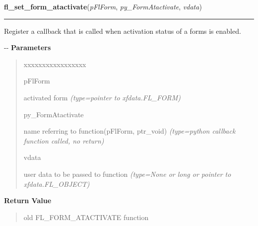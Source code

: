     \label{xformslib:flbasic:fl_set_form_atactivate}

    \vspace{0.5ex}

\hspace{.8\funcindent}\begin{boxedminipage}{\funcwidth}

    \raggedright \textbf{fl\_set\_form\_atactivate}(\textit{pFlForm}, \textit{py\_FormAtactivate}, \textit{vdata})

    \vspace{-1.5ex}

    \rule{\textwidth}{0.5\fboxrule}
\setlength{\parskip}{2ex}

Register a callback that is called when activation status of a forms
is enabled.

-{}-
\setlength{\parskip}{1ex}
      \textbf{Parameters}
      \vspace{-1ex}

      \begin{quote}
        \begin{Ventry}{xxxxxxxxxxxxxxxxx}

          \item[pFlForm]


activated form
            {\it (type=pointer to xfdata.FL\_FORM)}

          \item[py\_FormAtactivate]


name referring to function(pFlForm, ptr\_void)
            {\it (type=python callback function called, no return)}

          \item[vdata]


user data to be passed to function
            {\it (type=None or long or pointer to xfdata.FL\_OBJECT)}

        \end{Ventry}

      \end{quote}

      \textbf{Return Value}
    \vspace{-1ex}

      \begin{quote}

old FL\_FORM\_ATACTIVATE function
      \end{quote}


\end{boxedminipage}
